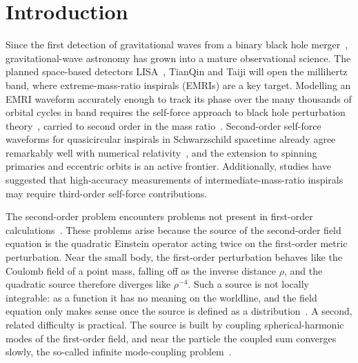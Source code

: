 \documentclass[aps,prd,twocolumn,superscriptaddress,nofootinbib,floatfix]{revtex4-2}
\begin{document}
\maketitle

{\hypersetup{linkcolor=black}\tableofcontents}

\section{Introduction}\label{sec:intro}

Since the first detection of gravitational waves from a binary black hole merger~\cite{LIGO2016}, gravitational-wave astronomy has grown into a mature observational science.
The planned space-based detectors LISA~\cite{LISA2017}, TianQin and Taiji will open the millihertz band, where extreme-mass-ratio inspirals (EMRIs) are a key target.
Modelling an EMRI waveform accurately enough to track its phase over the many thousands of orbital cycles in band requires the self-force approach to black hole perturbation theory~\cite{BarackPound2019,PoundWardell2021}, carried to second order in the mass ratio~\cite{Pound2012,Warburton2021,Wardell2023,Pound2020}.
Second-order self-force waveforms for quasicircular inspirals in Schwarzschild spacetime already agree remarkably well with numerical relativity~\cite{Wardell2023}, and the extension to spinning primaries and eccentric orbits is an active frontier. Additionally, studies have suggested that high-accuracy measurements of intermediate-mass-ratio inspirals~\cite{} may require third-order self-force contributions.

The second-order problem encounters problems not present in first-order calculations~\cite{}.
These problems arise because the source of the second-order field equation is the quadratic Einstein operator acting twice on the first-order metric perturbation.
Near the small body, the first-order perturbation behaves like the Coulomb field of a point mass, falling off as the inverse distance $\rho$, and the quadratic source therefore diverges like $\rho^{-4}$.
Such a source is not locally integrable: as a function it has no meaning on the worldline, and the field equation only makes sense once the source is defined as a distribution~\cite{MusaeusPoundUpton2026}.
A second, related difficulty is practical.
The source is built by coupling spherical-harmonic modes of the first-order field, and near the particle the coupled sum converges slowly, the so-called infinite mode-coupling problem~\cite{MillerWardellPound2016}.
\end{document}
